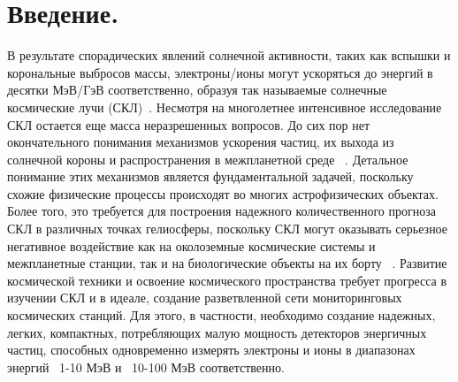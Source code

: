 \documentclass[12pt, a4paper, notitlepage, onecolumn]{article}
\begin{document}
\section*{Введение.} 
В результате спорадических  явлений солнечной активности, таких как вспышки и корональные выбросов массы, электроны/ионы могут ускоряться до энергий в десятки МэВ/ГэВ соответственно, образуя так называемые  солнечные космические лучи (СКЛ)~\cite{miroshnichenko2015solar}. Несмотря на многолетнее интенсивное исследование СКЛ остается еще масса неразрешенных вопросов. До сих пор нет окончательного понимания механизмов ускорения частиц, их выхода из солнечной короны и распространения в межпланетной среде ~\cite{miroshnichenko2015solar}. Детальное понимание этих механизмов является фундаментальной задачей, поскольку схожие физические процессы происходят во многих астрофизических объектах. Более того, это требуется для построения надежного количественного прогноза СКЛ в различных точках гелиосферы, поскольку СКЛ могут оказывать серьезное негативное воздействие как на околоземные космические системы и межпланетные станции, так и на биологические объекты на их борту ~\cite{petrukovich2008cosmic}. Развитие космической техники и освоение космического пространства требует прогресса в изучении СКЛ и в идеале, создание разветвленной сети мониторинговых космических станций. Для этого, в частности, необходимо создание надежных, легких, компактных, потребляющих малую мощность детекторов энергичных частиц, способных одновременно измерять электроны и ионы в диапазонах энергий ~1-10 МэВ и ~10-100 МэВ соответственно. 
\end{document}
